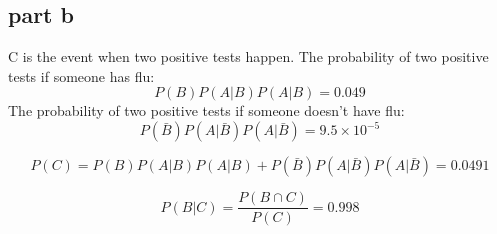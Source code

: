 \subsection{part b}
C is the event when two positive tests happen.
The probability of two positive tests if someone has flu:
$$
P(B)P(A\vert B)P(A\vert B) = 0.049
$$
The probability of two positive tests if someone doesn't have flu:
$$
P(\bar B)P(A\vert \bar B)P(A\vert \bar B) = 9.5\times10^{-5}
$$

$$
P(C) = P(B)P(A\vert B)P(A\vert B) + P(\bar B)P(A\vert \bar B)P(A\vert \bar B) = 0.0491
$$

$$
P(B\vert C) = \dfrac{P(B\cap C)}{P(C)} = 0.998
$$